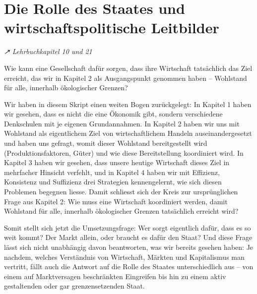 \documentclass[
  nswissgerman,
  a4paper,
  DIV=11,
  numbers=noendperiod,
  oneside,
  openany]{scrreprt}
\begin{document}
\chapter{Die Rolle des Staates und wirtschaftspolitische
Leitbilder}\label{die-rolle-des-staates-und-wirtschaftspolitische-leitbilder}

\emph{↗ Lehrbuchkapitel 10 und 21}

\begin{tcolorbox}[enhanced jigsaw, arc=.35mm, bottomrule=.15mm, bottomtitle=1mm, breakable, colback=white, colbacktitle=quarto-callout-note-color!10!white, colframe=quarto-callout-note-color-frame, coltitle=black, left=2mm, leftrule=.75mm, opacityback=0, opacitybacktitle=0.6, rightrule=.15mm, title={Leitfrage}, titlerule=0mm, toprule=.15mm, toptitle=1mm]

Wie kann eine Gesellschaft dafür sorgen, dass ihre Wirtschaft
tatsächlich das Ziel erreicht, das wir in Kapitel 2 als Ausgangspunkt
genommen haben -- Wohlstand für alle, innerhalb ökologischer Grenzen?

\end{tcolorbox}

Wir haben in diesem Skript einen weiten Bogen zurückgelegt: In Kapitel 1
haben wir gesehen, dass es nicht die eine Ökonomik gibt, sondern
verschiedene Denkschulen mit je eigenen Grundannahmen. In Kapitel 2
haben wir uns mit Wohlstand als eigentlichem Ziel von wirtschaftlichem
Handeln auseinandergesetzt und haben uns gefragt, womit dieser Wohlstand
bereitgestellt wird (Produktionsfaktoren, Güter) und wie diese
Bereitstellung koordiniert wird. In Kapitel 3 haben wir gesehen, dass
unsere heutige Wirtschaft dieses Ziel in mehrfacher Hinsicht verfehlt,
und in Kapitel 4 haben wir mit Effizienz, Konsistenz und Suffizienz drei
Strategien kennengelernt, wie sich diesen Problemen begegnen liesse.
Damit schliesst sich der Kreis zur ursprünglichen Frage aus Kapitel 2:
Wie muss eine Wirtschaft koordiniert werden, damit Wohlstand für alle,
innerhalb ökologischer Grenzen tatsächlich erreicht wird?

Somit stellt sich jetzt die Umsetzungsfrage: Wer sorgt eigentlich dafür,
dass es so weit kommt? Der Markt allein, oder braucht es dafür den
Staat? Und diese Frage lässt sich nicht unabhängig davon beantworten,
was wir bereits gesehen haben: Je nachdem, welches Verständnis von
Wirtschaft, Märkten und Kapitalismus man vertritt, fällt auch die
Antwort auf die Rolle des Staates unterschiedlich aus -- von einem auf
Marktversagen beschränkten Eingreifen bis hin zu einem aktiv
gestaltenden oder gar grenzensetzenden Staat.
\end{document}
